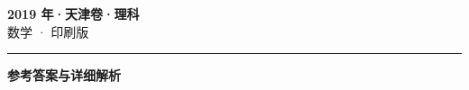 \documentclass[zihao=5, a4paper]{ctexart}
\begin{document}
\begin{center}
  {\Large\bfseries 2019 年·天津卷·理科}\\[4pt]
  {\large 数学 · 印刷版}
\end{center}
\medskip
{}

\par\bigskip\hrule\bigskip
{}
\begin{center}{\large\bfseries 参考答案与详细解析}\end{center}
\smallskip

\end{document}
